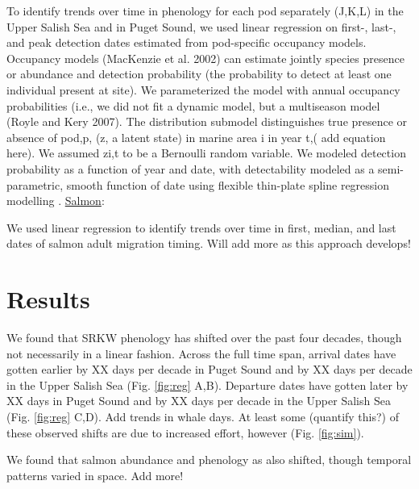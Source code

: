\documentclass{article}
\begin{document}
\par To identify trends over time in phenology for each pod separately (J,K,L) in the Upper Salish Sea and in Puget Sound, we used linear regression on first-, last-, and peak detection dates estimated from pod-specific occupancy models. Occupancy models (MacKenzie et al. 2002) can estimate jointly species presence or abundance and detection probability (the probability to detect at least one individual present at site). We parameterized the model with annual occupancy probabilities (i.e., we did not fit a dynamic model, but a multiseason model (Royle and Kery 2007). The distribution submodel distinguishes true presence or absence of pod,p, (z, a latent state) in marine area i in year t,( add equation here). We assumed zi,t to be a Bernoulli random variable. We modeled detection probability as a function of year and date, with detectability modeled as a semi-parametric, smooth function of date using flexible thin-plate spline regression modelling \citep{strebel2014}. 
\underline{Salmon}:
\par We used linear regression to identify trends over time in first, median, and last dates of salmon adult migration timing. Will add more as this approach develops!

\section*{Results}
\par We found that SRKW phenology has shifted over the past four decades, though not necessarily in a linear fashion. Across the full time span, arrival dates have gotten earlier by XX days per decade in Puget Sound and by XX days per decade in the Upper Salish Sea (Fig. \ref{fig:reg} A,B). 
Departure dates have gotten later by XX days in Puget Sound and by XX days per decade in the Upper Salish Sea (Fig. \ref{fig:reg} C,D). Add trends in whale days. At least some (quantify this?) of these observed shifts are due to increased effort, however (Fig. \ref{fig:sim}).
\par We found that salmon abundance and phenology as also shifted, though temporal patterns varied in space. Add more!
\end{document}
